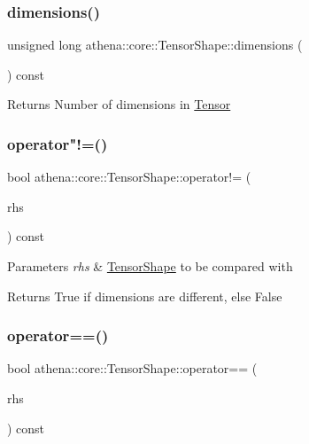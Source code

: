 \subsubsection{\texorpdfstring{dimensions()}{dimensions()}}
{\footnotesize\ttfamily unsigned long athena\+::core\+::\+Tensor\+Shape\+::dimensions (\begin{DoxyParamCaption}{ }\end{DoxyParamCaption}) const}

\begin{DoxyReturn}{Returns}
Number of dimensions in \mbox{\hyperlink{classathena_1_1core_1_1_tensor}{Tensor}} 
\end{DoxyReturn}
\mbox{\label{classathena_1_1core_1_1_tensor_shape_acdb5b20f9922cb4d7ee29a868fd05b1b}} 
\subsubsection{\texorpdfstring{operator"!=()}{operator!=()}}
{\footnotesize\ttfamily bool athena\+::core\+::\+Tensor\+Shape\+::operator!= (\begin{DoxyParamCaption}\item[{const \mbox{\hyperlink{classathena_1_1core_1_1_tensor_shape}{Tensor\+Shape}} \&}]{rhs }\end{DoxyParamCaption}) const}


\begin{DoxyParams}{Parameters}
{\em rhs} & \mbox{\hyperlink{classathena_1_1core_1_1_tensor_shape}{Tensor\+Shape}} to be compared with \\
\hline
\end{DoxyParams}
\begin{DoxyReturn}{Returns}
True if dimensions are different, else False 
\end{DoxyReturn}
\mbox{\label{classathena_1_1core_1_1_tensor_shape_aa42737e3e51e76507bb60791889d4d9b}} 
\subsubsection{\texorpdfstring{operator==()}{operator==()}}
{\footnotesize\ttfamily bool athena\+::core\+::\+Tensor\+Shape\+::operator== (\begin{DoxyParamCaption}\item[{const \mbox{\hyperlink{classathena_1_1core_1_1_tensor_shape}{Tensor\+Shape}} \&}]{rhs }\end{DoxyParamCaption}) const}


